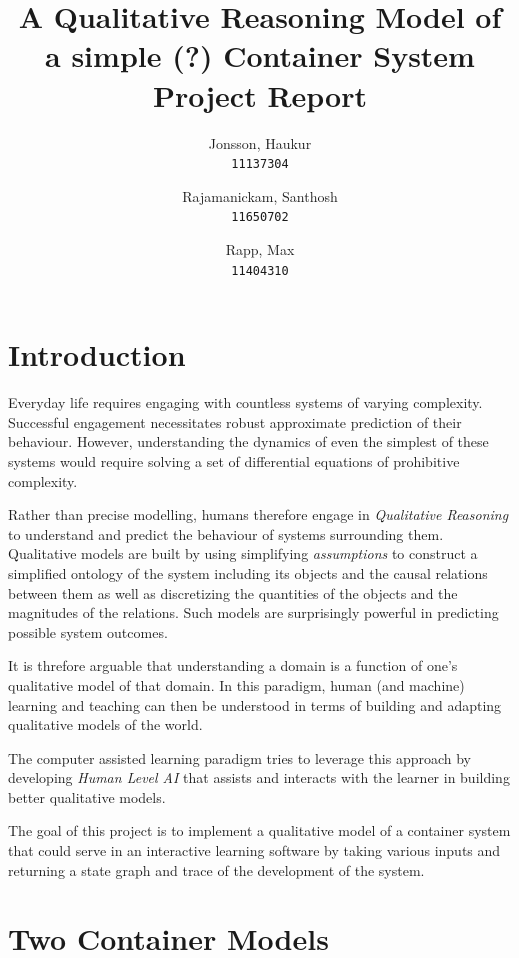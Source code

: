 \documentclass{article}
\begin{document}
\author{
  Jonsson, Haukur\\
  \texttt{11137304}
  \and
  Rajamanickam, Santhosh\\
  \texttt{11650702}
  \and
  Rapp, Max\\
  \texttt{11404310}
}
\title{A Qualitative Reasoning Model of a simple (?) Container System\\
	\large Project Report}
\maketitle



\section{Introduction}

Everyday life requires engaging with countless systems of varying complexity. Successful engagement necessitates robust approximate prediction of their behaviour. However, understanding the dynamics of even the simplest of these systems would require solving a set of differential equations of prohibitive complexity.

Rather than precise modelling, humans therefore engage in \textit{Qualitative Reasoning} to understand and predict the behaviour of systems surrounding them. Qualitative models are built by using simplifying \textit{assumptions} to construct a simplified ontology of the system including its objects and the causal relations between them as well as discretizing the quantities of the objects and the magnitudes of the relations. Such models are surprisingly powerful in predicting possible system outcomes.

It is threfore arguable that understanding a domain is a function of one's qualitative model of that domain. In this paradigm, human (and machine) learning and teaching can then be understood in terms of building and adapting qualitative models of the world. 

The computer assisted learning paradigm tries to leverage this approach by developing \textit{Human Level AI} that assists and interacts with the learner in building better qualitative models.

The goal of this project is to implement a qualitative model of a container system that could serve in an interactive learning software by taking various inputs and returning a state graph and trace of the development of the system.

\section{Two Container Models}
\end{document}
